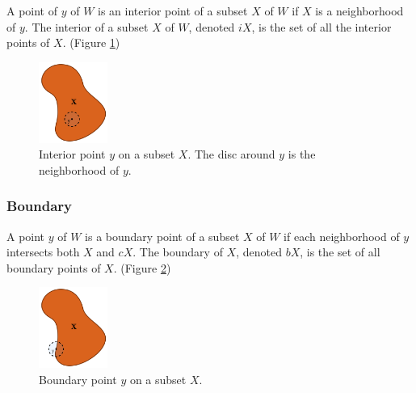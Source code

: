 \documentclass[a4paper,11pt,oneside]{article}
\begin{document}
\begin{definition}
	A point of $y$ of $W$ is an interior point of a subset $X$ of $W$ if $X$ is a neighborhood of $y$. The interior of a subset $X$ of $W$, denoted $iX$, is the set of all the interior points of $X$.\cite{Requicha1978MathematicalFO} (Figure \ref{sec3.2:interior-neighborhood})
\end{definition}
    

\begin{figure}[ht]
	\begin{center}
		\includegraphics[width=0.2\textwidth]{section3/3.2/interior.png}
	\end{center}
	\caption{Interior point $y$ on a subset $X$. The disc around $y$ is the neighborhood of $y$.}
	\label{sec3.2:interior-neighborhood}
\end{figure}

\subsubsection{Boundary}
    
\begin{definition}
	A point $y$ of $W$ is a boundary point of a subset $X$ of $W$ if each neighborhood of $y$ intersects both $X$ and $cX$. The boundary of $X$, denoted $bX$, is the set of all boundary points of $X$. \cite{Requicha1978MathematicalFO} (Figure \ref{sec3.2:boundary})
\end{definition}
    
\begin{figure}[ht]
	\begin{center}
		\includegraphics[width=0.2\textwidth]{section3/3.2/boundary.png}
	\end{center}
	\caption{Boundary point $y$ on a subset $X$.}
	\label{sec3.2:boundary}
\end{figure}
    
\end{document}

